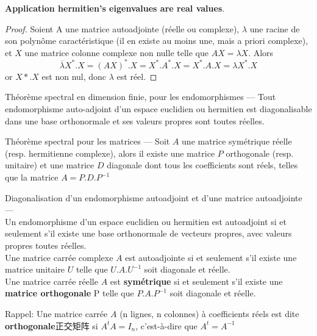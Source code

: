 \documentclass{book}
\begin{document}
\textbf{Application hermitien's eigenvalues are real values}.
\begin{proof}
Soient A une matrice autoadjointe (r\'eelle ou complexe), $\lambda$ une racine de son polyn\^ome caract\'eristique (il en existe au moins une, mais a priori complexe), et $X$ une matrice colonne complexe non nulle telle que
$AX=\lambda X$. Alors
$$ \overline\lambda X^*.X=(AX)^*.X=X^*.A^*.X=X^*.A.X=\lambda X^*.X $$
or $X*.X$ est non nul, donc $\lambda$ est r\'eel.
\end{proof}

\begin{theorem}
Th\'eor\`eme spectral en dimension finie, pour les endomorphismes —  Tout endomorphisme auto-adjoint d'un espace euclidien ou hermitien est diagonalisable dans une base orthonormale et ses valeurs propres sont toutes r\'eelles.

Th\'eor\`eme spectral pour les matrices —  Soit $A$ une matrice sym\'etrique r\'eelle (resp. hermitienne complexe), alors il existe une matrice $P$ orthogonale (resp. unitaire) et une matrice $D$ diagonale dont tous les coefficients sont r\'eels, telles que la matrice $A = P.D.P^{-1}$
\end{theorem}

\begin{theorem}
Diagonalisation d'un endomorphisme autoadjoint et d'une matrice autoadjointe — \\
Un endomorphisme d'un espace euclidien ou hermitien est autoadjoint si et seulement s'il existe une base orthonormale de vecteurs propres, avec valeurs propres toutes r\'eelles.\\
Une matrice carr\'ee complexe $A$ est autoadjointe si et seulement s'il existe une matrice unitaire $U$ telle que $U.A.U^{-1}$ soit diagonale et r\'eelle.\\
Une matrice carr\'ee r\'eelle $A$ est \textbf{sym\'etrique} si et seulement s'il existe une \textbf{matrice orthogonale} P telle que $P.A.P^{-1}$ soit diagonale et r\'eelle.
\end{theorem}
Rappel:
Une matrice carr\'ee $A$ (n lignes, n colonnes) \`a coefficients r\'eels est dite \textbf{orthogonale}正交矩阵 si $A^t A = I_n$, c'est-\`a-dire que $A^t = A^{-1}$
\end{document}
